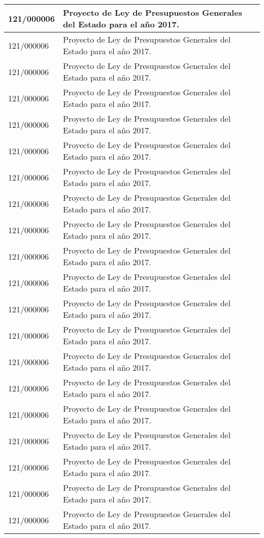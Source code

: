 {\begin{table}[H]
\begin{center}
\begin{tabularx}{\linewidth}{| l | X |}
\hline
121/000006 & Proyecto de Ley de Presupuestos Generales del Estado para el año 2017. \\
\hline
121/000006 & Proyecto de Ley de Presupuestos Generales del Estado para el año 2017. \\
\hline
121/000006 & Proyecto de Ley de Presupuestos Generales del Estado para el año 2017. \\
\hline
121/000006 & Proyecto de Ley de Presupuestos Generales del Estado para el año 2017. \\
\hline
121/000006 & Proyecto de Ley de Presupuestos Generales del Estado para el año 2017. \\
\hline
121/000006 & Proyecto de Ley de Presupuestos Generales del Estado para el año 2017. \\
\hline
121/000006 & Proyecto de Ley de Presupuestos Generales del Estado para el año 2017. \\
\hline
121/000006 & Proyecto de Ley de Presupuestos Generales del Estado para el año 2017. \\
\hline
121/000006 & Proyecto de Ley de Presupuestos Generales del Estado para el año 2017. \\
\hline
121/000006 & Proyecto de Ley de Presupuestos Generales del Estado para el año 2017. \\
\hline
121/000006 & Proyecto de Ley de Presupuestos Generales del Estado para el año 2017. \\
\hline
121/000006 & Proyecto de Ley de Presupuestos Generales del Estado para el año 2017. \\
\hline
121/000006 & Proyecto de Ley de Presupuestos Generales del Estado para el año 2017. \\
\hline
121/000006 & Proyecto de Ley de Presupuestos Generales del Estado para el año 2017. \\
\hline
121/000006 & Proyecto de Ley de Presupuestos Generales del Estado para el año 2017. \\
\hline
121/000006 & Proyecto de Ley de Presupuestos Generales del Estado para el año 2017. \\
\hline
121/000006 & Proyecto de Ley de Presupuestos Generales del Estado para el año 2017. \\
\hline
121/000006 & Proyecto de Ley de Presupuestos Generales del Estado para el año 2017. \\
\hline
121/000006 & Proyecto de Ley de Presupuestos Generales del Estado para el año 2017. \\
\hline
121/000006 & Proyecto de Ley de Presupuestos Generales del Estado para el año 2017. \\

\end{tabularx}
\end{center}
\end{table}}
